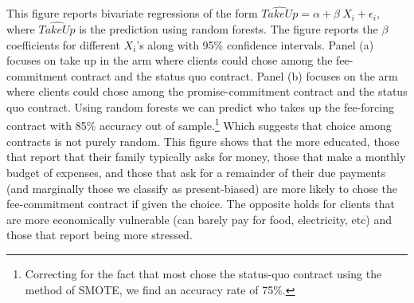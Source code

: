\documentclass[oneside,11pt]{article}
\begin{document}
\scriptsize {
\noindent This figure reports bivariate regressions of the form $\widehat{TakeUp} = \alpha + \beta \: X_i + \epsilon_i$, where $\widehat{TakeUp}$ is the prediction using random forests. The figure reports the $\beta$ coefficients for different $X_i$'s along with 95\% confidence intervals. Panel (a) focuses on take up in the arm where clients could chose among the fee-commitment contract and the status quo contract. Panel (b) focuses on the arm where clients could chose among the promise-commitment contract and the status quo contract. Using random forests we can predict who takes up the fee-forcing contract with 85\% accuracy out of sample.\footnote{Correcting for the fact that most chose the status-quo contract using the method of SMOTE, \cite{smote} we find an accuracy rate of 75\%.} Which suggests that choice among contracts is not purely random. This figure shows that the more educated, those that report that their family typically asks for money, those that make a monthly budget of expenses, and those that ask for a remainder of their due payments (and marginally those we classify as present-biased) are more likely to chose the fee-commitment contract if given the choice. The opposite holds for clients that are more economically vulnerable (can barely pay for food, electricity, etc) and those that report being more stressed.
}









\end{document}
